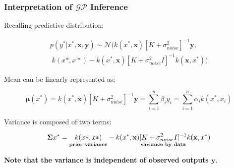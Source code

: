 \documentclass[10pt]{beamer}
\newcommand{\bx}{\mathbf{x}}
\newcommand{\by}{\mathbf{y}}
\newcommand{\gp}{\mathcal{GP}}
\newcommand{\gaussN}{\mathcal{N}}
\newcommand{\bmu}{\boldsymbol{\mu}}
\newcommand{\bSig}{\boldsymbol{\Sigma}}
\begin{document}
  \begin{frame}
    \frametitle{Interpretation of $\gp$ Inference}
    Recalling predictive distribution:

    \begin{equation*}
      \begin{array}{c}
        p(y^*|x^*,\bx,\by) \sim \gaussN ( k(x^*,\bx)[K + \sigma^2_{noise}]^{-1}\by, \\[0.2cm]
        \; k(x*,x*) - k(x^*,\bx)[K + \sigma^2_{noise}I]^{-1} k(\bx,x^*) )
      \end{array}
    \end{equation*}

    \pause

    Mean can be linearly represented as:

    \begin{equation*}
      \bmu(x^*) = k(x^*,\bx)[K + \sigma_{noise}^2]^{-1} \by = \sum_{i=1}^n \beta_iy_i = \sum_{i=1}^n \alpha_ik(x^*,x_i)
    \end{equation*}

    \pause

    Variance is composed of two terms:

    \begin{equation*}
      \bSig{x^*} = \underset{\text{\textbf{prior variance}}}{k(x*,x*)} - \underset{\text{\textbf{variance by data}}}{k(x^*,\bx)[K + \sigma^2_{noise}I]^{-1} k(\bx,x^*)}
    \end{equation*}

    \textbf{Note that the variance is independent of observed outputs $\by$}.
  \end{frame}
\end{document}
